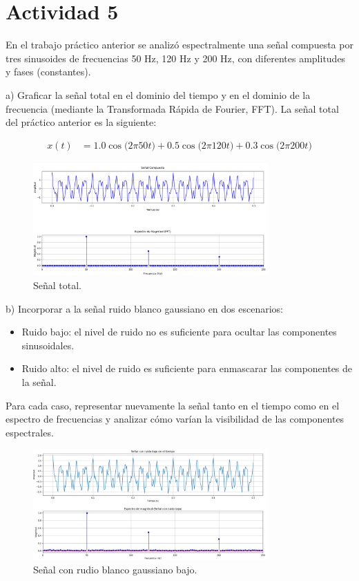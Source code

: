 \section{Actividad 5}
En el trabajo práctico anterior se analizó espectralmente una señal compuesta por tres 
sinusoides de frecuencias 50 Hz, 120 Hz y 200 Hz, con diferentes amplitudes y fases 
(constantes). 

a) Graficar la señal total en el dominio del tiempo y en el dominio de la frecuencia 
(mediante la Transformada Rápida de Fourier, FFT). 
\bigskip
La señal total del práctico anterior es la siguiente:

\[
\begin{aligned}
x(t) &= 1.0 \cos\!\bigl(2\pi 50 t\bigr)
      + 0.5 \cos\!\bigl(2\pi 120 t\bigr)
      + 0.3 \cos\!\bigl(2\pi 200 t\bigr)
\end{aligned}
\]

\bigskip
\begin{figure}[H]
\centering
\includegraphics[width=0.8\textwidth]{parte_teorica/senalcompuesta.png}
\caption{Señal total.}
\end{figure}
\bigskip

b) Incorporar a la señal ruido blanco gaussiano en dos escenarios: 

\begin{itemize}
 \item Ruido bajo: el nivel de ruido no es suficiente para ocultar las componentes 
sinusoidales. 
 \item Ruido alto: el nivel de ruido es suficiente para enmascarar las componentes de 
la señal. 
\end{itemize}
Para cada caso, representar nuevamente la señal tanto en el tiempo como en el 
espectro de frecuencias y analizar cómo varían la visibilidad de las componentes 
espectrales. 

\bigskip
\begin{figure}[H]
\centering
\includegraphics[width=0.8\textwidth]{parte_teorica/senalconruidobajo.png}
\caption{Señal con rudio blanco gaussiano bajo.}
\end{figure}
\bigskip

